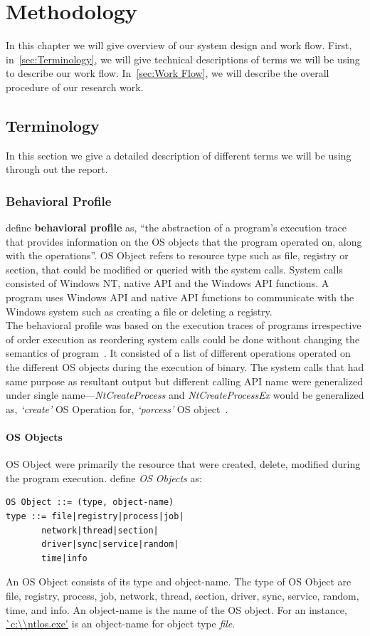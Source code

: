\chapter{Methodology}\label{chapter:methodology}
In this chapter we will give overview of our system design and work flow.
First, in~\autoref{sec:Terminology}, we will give technical descriptions of terms we will be using to describe our work flow.
In~\autoref{sec:Work Flow}, we will describe the overall procedure of our research work.
\section{Terminology}
\label{sec:Terminology}
In this section we give a detailed description of different terms we will be using through out the report.
\subsection{Behavioral Profile}
\label{sub:Behavioral Profile}
\citeauthor{bayer} define \textbf{behavioral profile} as, ``the abstraction of a program's execution trace that provides information on the OS objects that the program operated on, along with the operations''.
OS Object refers to resource type such as file, registry or section, that could be modified or queried with the system calls.
System calls consisted of Windows NT, native API and the Windows API functions.
A program uses Windows API and native API functions to communicate with the Windows system such as creating a file or deleting a registry.\\

The behavioral profile was based on the execution traces of programs irrespective of order execution as reordering system calls could be done without changing the semantics of program~\cite[]{bayer}.
It consisted of a list of different operations operated on the different OS objects during the execution of binary.
The system calls that had same purpose as resultant output but different calling API name were generalized under single name---\emph{NtCreateProcess} and \emph{NtCreateProcessEx} would be generalized as, \emph{`create'} OS Operation for, \emph{`porcess'} OS object~\cite[]{bayer}.\\
\subsubsection{OS Objects}
\label{ssub:OS Objects}
OS Object were primarily the resource that were created, delete, modified during the program execution.
\citeauthor{bayer} define \emph{OS Objects} as:
\begin{lstlisting}[numbers=none]
OS Object ::= (type, object-name)
type ::= file|registry|process|job|
       network|thread|section|
       driver|sync|service|random|
       time|info
\end{lstlisting}
An OS Object consists of its type and object-name.
The type of OS Object are file, registry, process, job, network, thread, section, driver, sync, service, random, time, and info.
An object-name is the name of the OS object.
For an instance, \url{`c:\\ntlos.exe'} is an object-name for object type \emph{file}.

